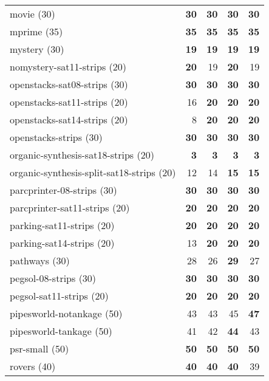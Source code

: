 \documentclass{article}
\newcommand{\numtasks}[1]{\small{(#1)}}
\begin{document}
\begin{tabular}{@{}lrrrr@{}}
movie \numtasks{30} & \textbf{30} & \textbf{30} & \textbf{30} & \textbf{30} \\
mprime \numtasks{35} & \textbf{35} & \textbf{35} & \textbf{35} & \textbf{35} \\
mystery \numtasks{30} & \textbf{19} & \textbf{19} & \textbf{19} & \textbf{19} \\
nomystery-sat11-strips \numtasks{20} & \textbf{20} & 19 & \textbf{20} & 19 \\
openstacks-sat08-strips \numtasks{30} & \textbf{30} & \textbf{30} & \textbf{30} & \textbf{30} \\
openstacks-sat11-strips \numtasks{20} & 16 & \textbf{20} & \textbf{20} & \textbf{20} \\
openstacks-sat14-strips \numtasks{20} & 8 & \textbf{20} & \textbf{20} & \textbf{20} \\
openstacks-strips \numtasks{30} & \textbf{30} & \textbf{30} & \textbf{30} & \textbf{30} \\
organic-synthesis-sat18-strips \numtasks{20} & \textbf{3} & \textbf{3} & \textbf{3} & \textbf{3} \\
organic-synthesis-split-sat18-strips \numtasks{20} & 12 & 14 & \textbf{15} & \textbf{15} \\
parcprinter-08-strips \numtasks{30} & \textbf{30} & \textbf{30} & \textbf{30} & \textbf{30} \\
parcprinter-sat11-strips \numtasks{20} & \textbf{20} & \textbf{20} & \textbf{20} & \textbf{20} \\
parking-sat11-strips \numtasks{20} & \textbf{20} & \textbf{20} & \textbf{20} & \textbf{20} \\
parking-sat14-strips \numtasks{20} & 13 & \textbf{20} & \textbf{20} & \textbf{20} \\
pathways \numtasks{30} & 28 & 26 & \textbf{29} & 27 \\
pegsol-08-strips \numtasks{30} & \textbf{30} & \textbf{30} & \textbf{30} & \textbf{30} \\
pegsol-sat11-strips \numtasks{20} & \textbf{20} & \textbf{20} & \textbf{20} & \textbf{20} \\
pipesworld-notankage \numtasks{50} & 43 & 43 & 45 & \textbf{47} \\
pipesworld-tankage \numtasks{50} & 41 & 42 & \textbf{44} & 43 \\
psr-small \numtasks{50} & \textbf{50} & \textbf{50} & \textbf{50} & \textbf{50} \\
rovers \numtasks{40} & \textbf{40} & \textbf{40} & \textbf{40} & 39 \\

\end{tabular}
\end{document}

